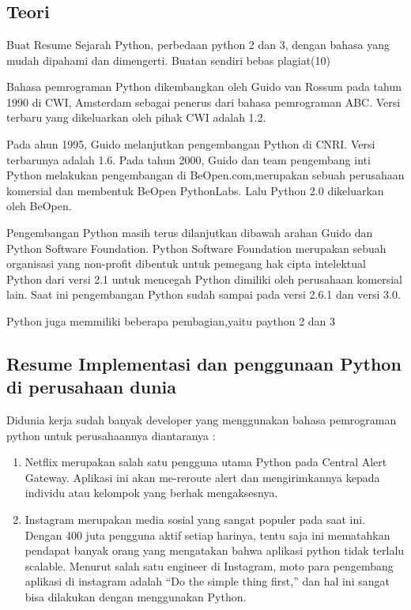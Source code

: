 \chapter{}

\section{Teori}
 Buat Resume Sejarah Python, perbedaan python 2 dan 3, dengan bahasa yang mudah dipahami dan dimengerti. Buatan sendiri bebas plagiat(10)
 
 Bahasa pemrograman Python dikembangkan oleh Guido van Rossum pada tahun 1990 di CWI, Amsterdam sebagai penerus dari bahasa pemrograman ABC. Versi terbaru yang dikeluarkan oleh pihak CWI adalah 1.2.

Pada ahun 1995, Guido melanjutkan pengembangan Python di CNRI. Versi terbarunya adalah 1.6. Pada tahun 2000, Guido dan team pengembang inti Python melakukan pengembangan di BeOpen.com,merupakan sebuah perusahaan komersial dan membentuk BeOpen PythonLabs. Lalu Python 2.0 dikeluarkan oleh BeOpen.

Pengembangan Python masih terus dilanjutkan dibawah arahan Guido dan Python Software Foundation. Python Software Foundation merupakan sebuah organisasi yang non-profit dibentuk untuk pemegang hak cipta intelektual Python dari versi 2.1 untuk mencegah Python dimiliki oleh perusahaan komersial lain. Saat ini pengembangan Python sudah sampai pada versi 2.6.1 dan versi 3.0.

Python juga memmiliki beberapa pembagian,yaitu paython 2 dan 3

\section{Resume Implementasi dan penggunaan Python di perusahaan dunia}
Didunia kerja sudah banyak developer yang menggunakan bahasa pemrograman python untuk perusahaannya diantaranya :
\begin{enumerate}
    \item 
    Netflix merupakan salah satu pengguna utama Python pada Central Alert Gateway. Aplikasi ini akan me-reroute alert dan mengirimkannya kepada individu atau kelompok yang berhak mengaksesnya.
    \item
    Instagram merupakan media sosial yang sangat populer pada saat ini. Dengan 400 juta pengguna aktif setiap harinya, tentu saja ini mematahkan pendapat banyak orang yang mengatakan bahwa aplikasi python tidak terlalu scalable. Menurut salah satu engineer di Instagram, moto para pengembang aplikasi di instagram adalah “Do the simple thing first,” dan hal ini sangat bisa dilakukan dengan menggunakan Python.
\end{enumerate}

